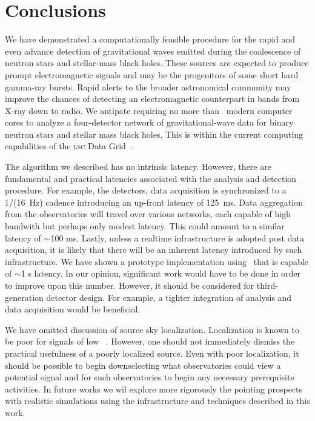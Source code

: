 \section{Conclusions}
\label{SECV}\label{sec:conclusions}

%
We have demonstrated a computationally feasible procedure for the rapid and even advance
detection of gravitational waves emitted during the coalescence of neutron
stars and stellar-mass black holes.  These sources are expected to produce
prompt electromagnetic signals and may be the progenitors of some short hard
gamma-ray bursts.  Rapid alerts to the broader astronomical community may
improve the chances of detecting an electromagnetic counterpart in bands from
X-ray down to radio.  We antipate requiring no more than \numcpus\ modern
%
%
%
computer cores to analyze a four-detector network of gravitational-wave data
for binary neutron stars and stellar mass black holes.  This is within the
current computing capabilities of the \textsc{lsc} Data Grid~\cite{LDG}.

The algorithm we described has no intrinsic latency.  However, there are
fundamental and practical latencies associated with the analysis and detection
procedure. For example, the \LIGO{} detectors, data acquisition is synchronized
to a 1/(16~Hz) cadence introducing an up-front latency of 125~ms.  Data
%
%
%
aggregation from the observatories will travel over various networks, each
capable of high bandwith but perhaps only modest latency.  This could amount to
a similar latency of $\sim$100 ms.  Lastly, unless a realtime infrastructure is
adopted post data acquisition, it is likely that there will be an inherent
latency introduced by such infrastructure.  We have shown a prototype
implementation using \gstlal\ that is capable of $\sim$1 s latency. In our
opinion, significant work would have to be done in order to improve upon this
number. However, it should be considered for third-generation detector design.
For example, a tighter integration of analysis and data acquisition would be
beneficial.

%
We have omitted discussion of source sky localization. Localization is known to
be poor for signals of low \SNR~\cite{Fairhurst2009}.
However, one should not immediately dismiss the practical usefulness of a
poorly localized source. Even with poor localization, it should be possible to
begin downselecting what observatories could view a potential signal and for
such observatories to begin any necessary prerequisite activities. In future
works we wil explore more rigorously the pointing prospects with realistic
simulations using the infrastructure and techniques described in this work.

